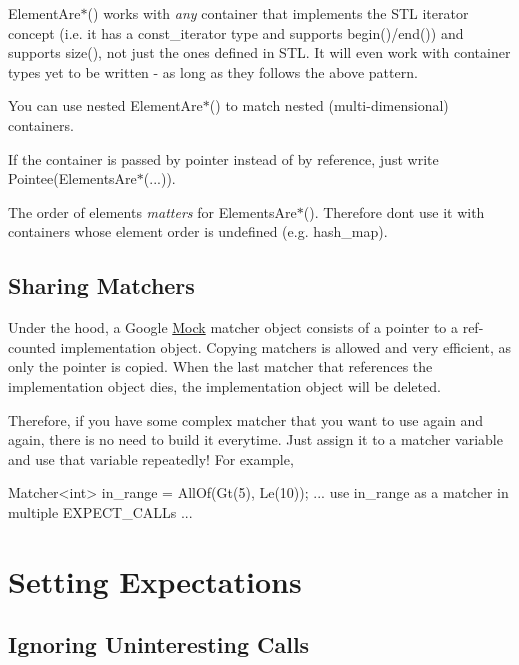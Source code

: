 \begin{DoxyItemize}
\item {\ttfamily Element\+Are$\ast$()} works with {\itshape any} container that implements the S\+TL iterator concept (i.\+e. it has a {\ttfamily const\+\_\+iterator} type and supports {\ttfamily begin()/end()}) and supports {\ttfamily size()}, not just the ones defined in S\+TL. It will even work with container types yet to be written -\/ as long as they follows the above pattern.
\item You can use nested {\ttfamily Element\+Are$\ast$()} to match nested (multi-\/dimensional) containers.
\item If the container is passed by pointer instead of by reference, just write {\ttfamily Pointee(Elements\+Are$\ast$(...))}.
\item The order of elements {\itshape matters} for {\ttfamily Elements\+Are$\ast$()}. Therefore don\textquotesingle{}t use it with containers whose element order is undefined (e.\+g. {\ttfamily hash\+\_\+map}).
\end{DoxyItemize}

\subsection*{Sharing Matchers}

Under the hood, a Google \hyperlink{class_mock}{Mock} matcher object consists of a pointer to a ref-\/counted implementation object. Copying matchers is allowed and very efficient, as only the pointer is copied. When the last matcher that references the implementation object dies, the implementation object will be deleted.

Therefore, if you have some complex matcher that you want to use again and again, there is no need to build it everytime. Just assign it to a matcher variable and use that variable repeatedly! For example,


\begin{DoxyCode}
Matcher<int> in\_range = AllOf(Gt(5), Le(10));
... use in\_range as a matcher in multiple EXPECT\_CALLs ...
\end{DoxyCode}


\section*{Setting Expectations}

\subsection*{Ignoring Uninteresting Calls}

